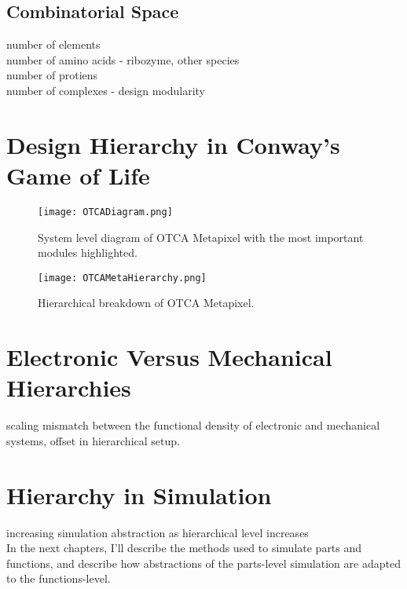 {\subsection{Combinatorial Space}

number of elements\\
number of amino acids - ribozyme, other species\\
number of protiens\\
number of complexes - design modularity\\




\section{Design Hierarchy in Conway's Game of Life}

\begin{figure}
  \texttt{[image: OTCADiagram.png]}
  \caption{System level diagram of OTCA Metapixel with the most important modules highlighted.}
  \label{fig:OTCADiagram}
\end{figure}

\begin{sidewaysfigure}
  \texttt{[image: OTCAMetaHierarchy.png]}
  \caption{Hierarchical breakdown of OTCA Metapixel.}
  \label{fig:OTCAMetaHierarchy}
\end{sidewaysfigure}

\section{Electronic Versus Mechanical Hierarchies}

scaling mismatch between the functional density of electronic and mechanical systems, offset in hierarchical setup.

\section{Hierarchy in Simulation}

increasing simulation abstraction as hierarchical level increases\\

In the next chapters, I'll describe the methods used to simulate parts and functions, and describe how abstractions of the parts-level simulation are adapted to the functions-level.



}
